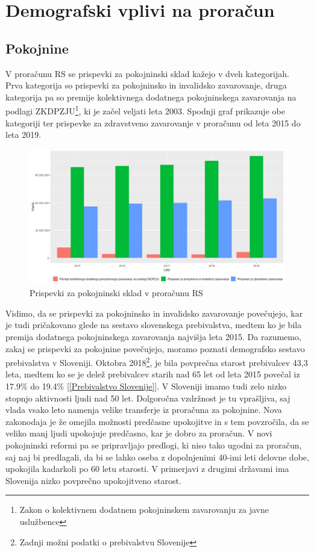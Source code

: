 \documentclass[12pt, a4paper]{article}
\begin{document}
\newpage
\section[Demografski vplivi na proračun]{Demografski vplivi na proračun}
\subsection[Pokojnine]{Pokojnine}
V proračunu RS se prispevki za pokojninski sklad kažejo v dveh kategorijah. Prva kategorija so prispevki za pokojninsko in invalidsko zavarovanje, druga kategorija pa so premije kolektivnega dodatnega pokojninskega zavarovanja na podlagi ZKDPZJU\footnote{Zakon o kolektivnem dodatnem pokojninskem zavarovanju za javne uslužbence}, ki je začel veljati leta 2003. Spodnji graf prikazuje obe kategoriji ter prispevke za zdravstveno zavarovanje v proračunu od leta 2015 do leta 2019.
\begin{figure}[h]
\centering
\includegraphics[width = 14 cm]{prispevki_delodajalcev_za_socialno_varnost_graf.png}
\caption{Prispevki za pokojninski sklad v proračunu RS}
\label{Slika 1}
\end{figure}

Vidimo, da se prispevki za pokojninsko in invalidsko zavarovanje povečujejo, kar je tudi pričakovano glede na sestavo slovenskega prebivalstva, medtem ko je bila premija dodatnega pokojninskega zavarovanja najvišja leta 2015. Da razumemo, zakaj se prispevki za pokojnine povečujejo, moramo poznati demografsko sestavo prebivalstva v Sloveniji. Oktobra 2018\footnote{Zadnji možni podatki o prebivalstvu Slovenije}, je bila povprečna starost prebivalcev 43,3 leta, medtem ko se je delež prebivalcev starih nad 65 let od leta 2015 povečal iz 17.9\% do 19.4\% [\ref{Prebivalstvo Slovenije}]. V Sloveniji imamo tudi zelo nizko stopnjo aktivnosti ljudi nad 50 let. Dolgoročna vzdržnost je tu vprašljiva, saj vlada vsako leto namenja velike transferje iz proračuna za pokojnine. Nova zakonodaja je že omejila možnosti predčasne upokojitve in s tem povzročila, da se veliko manj ljudi upokojuje predčasno, kar je dobro za proračun. V novi pokojninski reformi pa se pripravljajo predlogi, ki niso tako ugodni za proračun, saj naj bi predlagali, da bi se lahko oseba z dopolnjenimi 40-imi leti delovne dobe, upokojila kadarkoli po 60 letu starosti. V primerjavi z drugimi državami ima Slovenija nizko povprečno upokojitveno starost.
\end{document}
